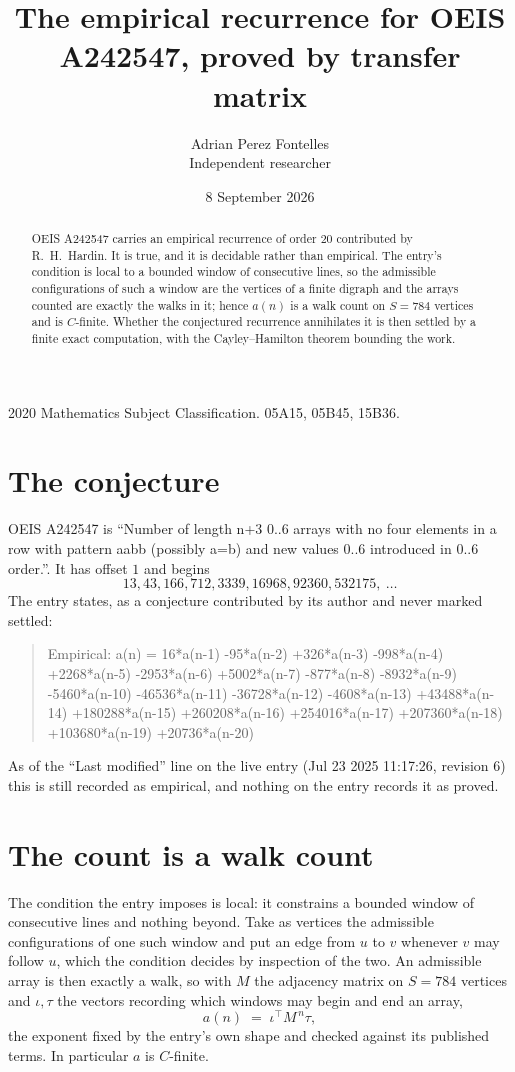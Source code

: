 \documentclass[11pt,a4paper]{article}
\title{The empirical recurrence for OEIS A242547, proved by transfer matrix}
\author{Adrian Perez Fontelles\\ \small Independent researcher}
\date{8 September 2026}
\theoremstyle{plain}
\theoremstyle{definition}
\begin{document}
\maketitle

\begin{abstract}
OEIS A242547 carries an empirical recurrence of order $20$ contributed by R.~H.~Hardin. It is
true, and it is decidable rather than empirical. The entry's condition is local to a bounded window of consecutive lines, so
the admissible configurations of such a window are the vertices of a finite digraph and the
arrays counted are exactly the walks in it; hence $a(n)$ is a walk count on $S=784$ vertices
and is $C$-finite. Whether the conjectured recurrence annihilates it is then settled by a
finite exact computation, with the Cayley--Hamilton theorem bounding the work.
\end{abstract}

\noindent\small 2020 Mathematics Subject Classification. 05A15, 05B45, 15B36.\normalsize

\section{The conjecture}

OEIS A242547 is ``Number of length n+3 0..6 arrays with no four elements in a row with pattern aabb (possibly a=b) and new values 0..6 introduced in 0..6 order.''. It has offset $1$ and begins
\[
13, 43, 166, 712, 3339, 16968, 92360, 532175,\ \dots
\]
The entry states, as a conjecture contributed by its author and never marked settled:
\begin{quote}
Empirical: a(n) = 16*a(n-1) -95*a(n-2) +326*a(n-3) -998*a(n-4) +2268*a(n-5) -2953*a(n-6) +5002*a(n-7) -877*a(n-8) -8932*a(n-9) -5460*a(n-10) -46536*a(n-11) -36728*a(n-12) -4608*a(n-13) +43488*a(n-14) +180288*a(n-15) +260208*a(n-16) +254016*a(n-17) +207360*a(n-18) +103680*a(n-19) +20736*a(n-20)
\end{quote}
As of the ``Last modified'' line on the live entry (Jul 23 2025 11:17:26, revision 6) this is still
recorded as empirical, and nothing on the entry records it as proved.

\section{The count is a walk count}

The condition the entry imposes is local: it constrains a bounded window of consecutive lines and nothing beyond. Take as
vertices the admissible configurations of one such window and put an edge from $u$ to $v$
whenever $v$ may follow $u$, which the condition decides by inspection of the two. An
admissible array is then exactly a walk, so with $M$ the adjacency matrix on $S=784$ vertices
and $\iota,\tau$ the vectors recording which windows may begin and end an array,
\[
a(n)\;=\;\iota^{\!\top}M^{\,n}\tau ,
\]
the exponent fixed by the entry's own shape and checked against its published terms. In
particular $a$ is $C$-finite.
\end{document}
